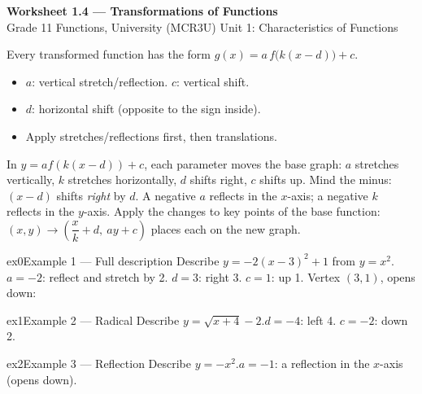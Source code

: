 \documentclass[11pt]{article}
\begin{document}
\begin{center}
{\LARGE\bfseries\color{titleblue}Worksheet 1.4 --- Transformations of Functions}\\[2pt]
{\small Grade 11 Functions, University (MCR3U) \textperiodcentered{} Unit 1: Characteristics of Functions}
\end{center}

\begin{ideabox}
Every transformed function has the form $g(x)=a\,f\big(k(x-d)\big)+c$.
\begin{itemize}[leftmargin=*,itemsep=2pt]
  \item $a$: vertical stretch/reflection. $c$: vertical shift.
  \item $d$: horizontal shift (opposite to the sign inside).
  \item Apply stretches/reflections first, then translations.
\end{itemize}
\end{ideabox}

\begin{learnbox}
In $y=af\!\left(k(x-d)\right)+c$, each parameter moves the base graph: $a$ stretches vertically, $k$ stretches horizontally, $d$ shifts right, $c$ shifts up.
Mind the minus: $(x-d)$ shifts \emph{right} by $d$. A negative $a$ reflects in the $x$-axis; a negative $k$ reflects in the $y$-axis.
Apply the changes to key points of the base function: $(x,y)\to\left(\dfrac{x}{k}+d,\ ay+c\right)$ places each on the new graph.
\end{learnbox}


\begin{example}{ex0}{Example 1 --- Full description}
Describe $y=-2(x-3)^2+1$ from $y=x^2$.\soln $a=-2$: reflect and stretch by 2. $d=3$: right 3. $c=1$: up 1. Vertex $(3,1)$, opens down:
\end{example}

\begin{example}{ex1}{Example 2 --- Radical}
Describe $y=\sqrt{x+4}-2$.\soln $d=-4$: left 4. $c=-2$: down 2.
\end{example}

\begin{example}{ex2}{Example 3 --- Reflection}
Describe $y=-x^2$.\soln $a=-1$: a reflection in the $x$-axis (opens down).
\end{example}
\end{document}
